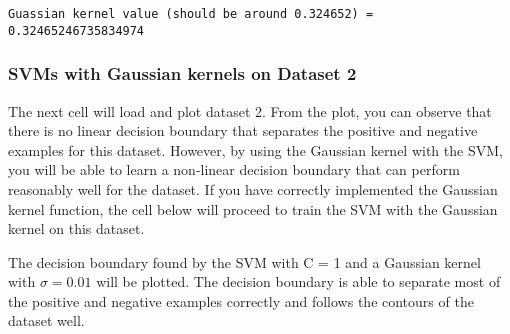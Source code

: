 \documentclass[11pt]{article}
\begin{document}
    \begin{Verbatim}[commandchars=\\\{\}]
Guassian kernel value (should be around 0.324652) =  0.32465246735834974

    \end{Verbatim}

    \hypertarget{svms-with-gaussian-kernels-on-dataset-2}{%
\subsubsection{SVMs with Gaussian kernels on Dataset
2}\label{svms-with-gaussian-kernels-on-dataset-2}}

The next cell will load and plot dataset 2. From the plot, you can
observe that there is no linear decision boundary that separates the
positive and negative examples for this dataset. However, by using the
Gaussian kernel with the SVM, you will be able to learn a non-linear
decision boundary that can perform reasonably well for the dataset. If
you have correctly implemented the Gaussian kernel function, the cell
below will proceed to train the SVM with the Gaussian kernel on this
dataset.

The decision boundary found by the SVM with C = 1 and a Gaussian kernel
with \(\sigma = 0.01\) will be plotted. The decision boundary is able to
separate most of the positive and negative examples correctly and
follows the contours of the dataset well.
\end{document}
